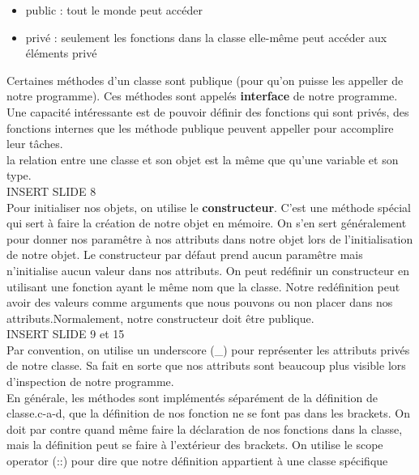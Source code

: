 \documentclass[oneside]{book}
\begin{document}
\begin{itemize}
\item public : tout le monde peut accéder
\item privé : seulement les fonctions dans la classe elle-même peut accéder aux éléments privé
\end{itemize}

Certaines méthodes d'un classe sont publique (pour qu'on puisse les appeller de notre programme). Ces méthodes sont appelés \textbf{interface} de notre programme. Une capacité intéressante est de pouvoir définir des fonctions qui sont privés, des fonctions internes que les méthode publique peuvent appeller pour accomplire leur tâches.\\

la relation entre une classe et son objet est la même que qu'une variable et son type.\\

INSERT SLIDE 8\\

Pour initialiser nos objets, on utilise le \textbf{constructeur}. C'est une méthode spécial qui sert à faire la création de notre objet en mémoire. On s'en sert généralement pour donner nos paramêtre à nos attributs dans notre objet lors de l'initialisation de notre objet. Le constructeur par défaut prend aucun paramêtre mais n'initialise aucun valeur dans nos attributs. On peut redéfinir un constructeur en utilisant une fonction ayant le même nom que la classe. Notre redéfinition peut avoir des valeurs comme arguments que nous pouvons ou non placer dans nos attributs.Normalement, notre constructeur doit être publique.  \\

INSERT SLIDE 9 et 15\\

Par convention, on utilise un underscore (\_) pour représenter les attributs privés de notre classe. Sa fait en sorte que nos attributs sont beaucoup plus visible lors d'inspection de notre programme.\\

En générale, les méthodes sont implémentés séparément de la définition de classe.c-a-d, que la définition de nos fonction ne se font pas dans les brackets. On doit par contre quand même faire la déclaration de nos fonctions dans la classe, mais la définition peut se faire à l'extérieur des brackets. On utilise le scope operator (::) pour dire que notre définition appartient à une classe spécifique\\
\end{document}
